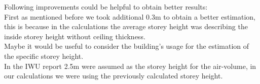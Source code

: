 Following improvements could be helpful to obtain better results:\\
First as mentioned before we took additional 0.3m to obtain a better estimation, this is because in the calculations the average storey height was describing the inside storey height without ceiling thickness.\\
Maybe it would be useful to consider the building's usage for the estimation of the specific storey height.\\
In the IWU report 2.5m were assumed as the storey height for the air-volume, in our calculations we were using the previously calculated storey height.
